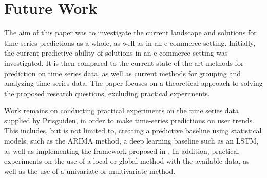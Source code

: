 
\section{Future Work}
\label{sections:Discussion:FutureWork}



% 

The aim of this paper was to investigate the current landscape and solutions for time-series predictions as a whole,
as well as in an e-commerce setting.
Initially, the current predictive ability of solutions in an e-commerce setting was investigated.
It is then compared to the current state-of-the-art methods for prediction on time series data,
as well as current methods for grouping and analyzing time-series data.
The paper focuses on a theoretical approach to solving the proposed research questions,
excluding practical experiments.

Work remains on conducting practical experiments on the time series data supplied by Prisguiden,
in order to make time-series predictions on user trends.
This includes, but is not limited to, creating a predictive baseline using statistical models, such as the ARIMA method, a deep learning baseline such as an LSTM,
as well as implementing the framework proposed in .
In addition, practical experiments on the use of a local or global method with the available data,
as well as the use of a univariate or multivariate method.

